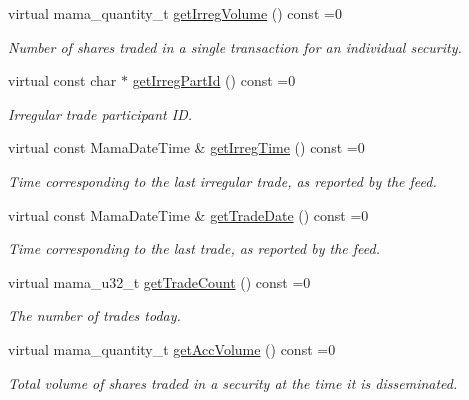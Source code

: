 \begin{CompactItemize}
virtual mama\_\-quantity\_\-t \hyperlink{classWombat_1_1MamdaTradeRecap_b361bc0a511353d976e092fb7972018d}{get\-Irreg\-Volume} () const =0
\begin{CompactList}\small\item\em Number of shares traded in a single transaction for an individual security. \item\end{CompactList}\item 
virtual const char $\ast$ \hyperlink{classWombat_1_1MamdaTradeRecap_0b7056cac747d7dad3679df840219adc}{get\-Irreg\-Part\-Id} () const =0
\begin{CompactList}\small\item\em Irregular trade participant ID. \item\end{CompactList}\item 
virtual const Mama\-Date\-Time \& \hyperlink{classWombat_1_1MamdaTradeRecap_3583496cc2f74b2b1537176b8d91f5d9}{get\-Irreg\-Time} () const =0
\begin{CompactList}\small\item\em Time corresponding to the last irregular trade, as reported by the feed. \item\end{CompactList}\item 
virtual const Mama\-Date\-Time \& \hyperlink{classWombat_1_1MamdaTradeRecap_c613c40f5f339c6c7508000c92cda65c}{get\-Trade\-Date} () const =0
\begin{CompactList}\small\item\em Time corresponding to the last trade, as reported by the feed. \item\end{CompactList}\item 
virtual mama\_\-u32\_\-t \hyperlink{classWombat_1_1MamdaTradeRecap_16854299d7b7266d833c7d8ce405baf2}{get\-Trade\-Count} () const =0
\begin{CompactList}\small\item\em The number of trades today. \item\end{CompactList}\item 
virtual mama\_\-quantity\_\-t \hyperlink{classWombat_1_1MamdaTradeRecap_1e7f8f77a649030465d7a4ccfa1baef0}{get\-Acc\-Volume} () const =0
\begin{CompactList}\small\item\em Total volume of shares traded in a security at the time it is disseminated. \item\end{CompactList}\item 

\end{CompactItemize}
